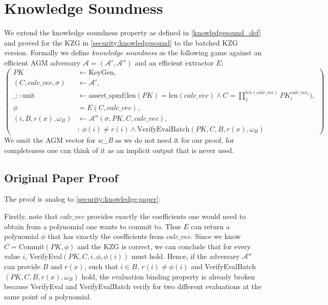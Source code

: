 \section{Knowledge Soundness}
We extend the knowledge soundness property as defined in \ref{knowledgesound_def}
and proved for the KZG in \ref{security:knowledgesound} to the batched KZG version. Formally we define \textit{knowledge soundness} as the following game against an efficient AGM adversary $\mathcal{A=(A',A'')}$ and an efficient extractor $E$: 
\begin{equation*}
    \left(
        \begin{aligned}
            PK &\leftarrow \text{KeyGen}, \\
            (C,calc\_vec, \sigma) &\leftarrow \mathcal{A'}, \\
            \_::\text{unit} &\leftarrow \text{assert\_spmf}\biggl(\text{len}(PK)=\text{len}(calc\_vec) \land C = \prod_{1}^{len(calc\_vec)}PK_i^{calc\_vec_i}\biggr), \\
            \phi &= E(C, calc\_vec),\\
            (i, B, r(x), \omega_B) &\leftarrow \mathcal{A''}(\sigma, PK, C, calc\_vec), \\
            & : \ \phi(i) \ne r(i) \land \text{VerifyEvalBatch}(PK,C,B,r(x),\omega_B)
        \end{aligned}
        \right)
\end{equation*}
We omit the AGM vector for \textit{w\_B} as we do not need it for our proof, for completeness one can think of it as an implicit output that is never used.

\subsection*{Original Paper Proof}
\label{batch:security:knowledge:paper}
The proof is analog to \ref{security:knowledge:paper}:

Firstly, note that $calc\_vec$ provides exactly the coefficients one would need to obtain from a polynomial one wants to commit to. Thus $E$ can return a polynomial $\phi$ that has exactly the coefficients from $calc\_vec$. Since we know $C= \text{Commit}(PK, \phi)$ and the KZG is correct, we can conclude that for every value $i$, VerifyEval$(PK, C, i, \phi, \phi(i))$ must hold. Hence, if the adversary $\mathcal{A''}$ can provide $B$ and $r(x)$, such that $i\in B$, $r(i)\ne\phi(i)$
and VerifyEvalBatch$(PK, C, B, r(x), \omega_B)$ hold, the evaluation binding property is already broken because VerifyEval and VerifyEvalBatch verify for two different evaluations at the same point of a polynomial.


